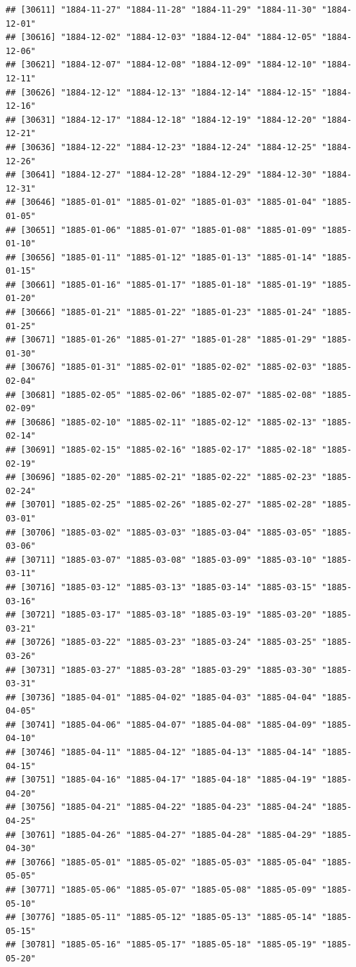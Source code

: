 \documentclass{article}\usepackage[]{graphicx}\usepackage[]{color}
\makeatletter
\newenvironment{kframe}{%
 \def\at@end@of@kframe{}%
 \ifinner\ifhmode%
  \def\at@end@of@kframe{\end{minipage}}%
  \begin{minipage}{\columnwidth}%
 \fi\fi%
 \def\FrameCommand##1{\hskip\@totalleftmargin \hskip-\fboxsep
 \colorbox{shadecolor}{##1}\hskip-\fboxsep
     \hskip-\linewidth \hskip-\@totalleftmargin \hskip\columnwidth}%
 \MakeFramed {\advance\hsize-\width
   \@totalleftmargin\z@ \linewidth\hsize
   \@setminipage}}%
 {\par\unskip\endMakeFramed%
 \at@end@of@kframe}
\newenvironment{knitrout}{}{} %
\makeatother
\begin{document}
\begin{description}
\begin{knitrout}
\begin{kframe}
\begin{verbatim}
## [30611] "1884-11-27" "1884-11-28" "1884-11-29" "1884-11-30" "1884-12-01"
## [30616] "1884-12-02" "1884-12-03" "1884-12-04" "1884-12-05" "1884-12-06"
## [30621] "1884-12-07" "1884-12-08" "1884-12-09" "1884-12-10" "1884-12-11"
## [30626] "1884-12-12" "1884-12-13" "1884-12-14" "1884-12-15" "1884-12-16"
## [30631] "1884-12-17" "1884-12-18" "1884-12-19" "1884-12-20" "1884-12-21"
## [30636] "1884-12-22" "1884-12-23" "1884-12-24" "1884-12-25" "1884-12-26"
## [30641] "1884-12-27" "1884-12-28" "1884-12-29" "1884-12-30" "1884-12-31"
## [30646] "1885-01-01" "1885-01-02" "1885-01-03" "1885-01-04" "1885-01-05"
## [30651] "1885-01-06" "1885-01-07" "1885-01-08" "1885-01-09" "1885-01-10"
## [30656] "1885-01-11" "1885-01-12" "1885-01-13" "1885-01-14" "1885-01-15"
## [30661] "1885-01-16" "1885-01-17" "1885-01-18" "1885-01-19" "1885-01-20"
## [30666] "1885-01-21" "1885-01-22" "1885-01-23" "1885-01-24" "1885-01-25"
## [30671] "1885-01-26" "1885-01-27" "1885-01-28" "1885-01-29" "1885-01-30"
## [30676] "1885-01-31" "1885-02-01" "1885-02-02" "1885-02-03" "1885-02-04"
## [30681] "1885-02-05" "1885-02-06" "1885-02-07" "1885-02-08" "1885-02-09"
## [30686] "1885-02-10" "1885-02-11" "1885-02-12" "1885-02-13" "1885-02-14"
## [30691] "1885-02-15" "1885-02-16" "1885-02-17" "1885-02-18" "1885-02-19"
## [30696] "1885-02-20" "1885-02-21" "1885-02-22" "1885-02-23" "1885-02-24"
## [30701] "1885-02-25" "1885-02-26" "1885-02-27" "1885-02-28" "1885-03-01"
## [30706] "1885-03-02" "1885-03-03" "1885-03-04" "1885-03-05" "1885-03-06"
## [30711] "1885-03-07" "1885-03-08" "1885-03-09" "1885-03-10" "1885-03-11"
## [30716] "1885-03-12" "1885-03-13" "1885-03-14" "1885-03-15" "1885-03-16"
## [30721] "1885-03-17" "1885-03-18" "1885-03-19" "1885-03-20" "1885-03-21"
## [30726] "1885-03-22" "1885-03-23" "1885-03-24" "1885-03-25" "1885-03-26"
## [30731] "1885-03-27" "1885-03-28" "1885-03-29" "1885-03-30" "1885-03-31"
## [30736] "1885-04-01" "1885-04-02" "1885-04-03" "1885-04-04" "1885-04-05"
## [30741] "1885-04-06" "1885-04-07" "1885-04-08" "1885-04-09" "1885-04-10"
## [30746] "1885-04-11" "1885-04-12" "1885-04-13" "1885-04-14" "1885-04-15"
## [30751] "1885-04-16" "1885-04-17" "1885-04-18" "1885-04-19" "1885-04-20"
## [30756] "1885-04-21" "1885-04-22" "1885-04-23" "1885-04-24" "1885-04-25"
## [30761] "1885-04-26" "1885-04-27" "1885-04-28" "1885-04-29" "1885-04-30"
## [30766] "1885-05-01" "1885-05-02" "1885-05-03" "1885-05-04" "1885-05-05"
## [30771] "1885-05-06" "1885-05-07" "1885-05-08" "1885-05-09" "1885-05-10"
## [30776] "1885-05-11" "1885-05-12" "1885-05-13" "1885-05-14" "1885-05-15"
## [30781] "1885-05-16" "1885-05-17" "1885-05-18" "1885-05-19" "1885-05-20"

\end{verbatim}
\end{kframe}
\end{knitrout}
\end{description}
\end{document}
